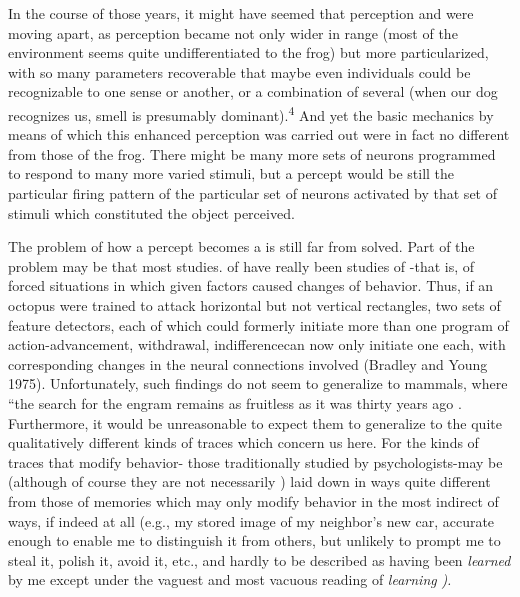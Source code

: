 In the course of those years, it might have seemed that per\-ception and  were moving apart, as perception became not only wider in range (most of the environment seems quite un\-differentiated to the frog) but more particularized, with so many parameters recoverable that maybe even individuals could be recogniz\-able to one sense or another, or a combination of several (when our dog recognizes us, smell is presumably dominant).\textsuperscript{4} And yet the basic mechanics by means of which this enhanced perception was carried out were in fact no different from those of the frog. There might be many more sets of neurons programmed to respond to many more varied  stimuli, but a percept would be still the particular
firing pattern of the particular set of neurons activated by that set of
stimuli which constituted the object perceived.

The problem of how a percept becomes a  is still far from solved. Part of the problem may be that most studies. of  have really been studies of -that is, of forced situations in which given factors caused changes of behavior. Thus, if an octopus were trained to attack horizontal but not vertical rectangles, two sets of feature detectors, each of which could formerly initiate more than one program of action-advancement, withdrawal, indifference\-can now only initiate one each, with corresponding changes in the neural connections involved (Bradley and Young 1975). Unfortunately, such findings do not seem to generalize to mammals, where ``the search for the engram remains as fruitless as it was thirty years ago \citep{Lashley1950}. Furthermore, it would be unreasonable to expect them to generalize to the quite qualitatively different kinds of  traces which concern us here. For the kinds of  traces that modify behavior- those traditionally studied by psychologists-may be (although of course they are not necessarily ) laid down in ways quite different from those of memories which may only modify beha\-vior in the most indirect of ways, if indeed at all (e.g., my stored  image of my neighbor's new car, accurate enough to enable me to distinguish it from others, but unlikely to prompt me to steal it, polish it, avoid it, etc., and hardly to be described as having been \textit{learned} by me except under the vaguest and most vacuous reading of \textit{learning} \textit{).}

